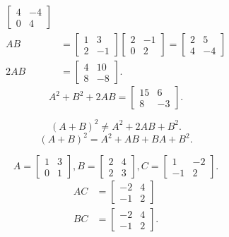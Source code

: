 \documentclass{article}
\begin{document}
\begin{example}[Find $(A+B)^2$, $A^2+2AB+B^2$]
\begin{align*}
\begin{bmatrix}
            4&-4\\
            0&4
        \end{bmatrix}
        \\
        AB &=
        \begin{bmatrix}
            1&3\\
            2&-1
        \end{bmatrix}
        \begin{bmatrix}
            2&-1\\
            0&2
        \end{bmatrix}
        =
        \begin{bmatrix}
            2&5\\
            4&-4
        \end{bmatrix}
        \\
        2AB &= \begin{bmatrix} 4&10\\8&-8 \end{bmatrix} 
    .\end{align*}
    \[
        A^2+B^2+2AB = \begin{bmatrix} 15&6\\8&-3 \end{bmatrix}
    .\] 

\end{example}

\begin{note}
    \[
        (A+B)^2 \neq A^2+2AB+B^2
    .\] 
    \[
        (A+B)^2 = A^2+AB+BA+B^2
    .\] 
\end{note}

\begin{example}[$AC=BC$ does not imply $A=B$]
    \[
        A =
        \begin{bmatrix}
            1&3\\
            0&1
        \end{bmatrix},
        B =
        \begin{bmatrix}
            2&4\\
            2&3
        \end{bmatrix},
        C =
        \begin{bmatrix}
            1&-2\\
            -1&2
        \end{bmatrix}
    .\] 
    \begin{align*}
        AC &=
        \begin{bmatrix} -2&4\\-1&2 \end{bmatrix} \\
        BC &=
        \begin{bmatrix} -2&4\\-1&2 \end{bmatrix} 
    .\end{align*}
\end{example}
\end{document}
